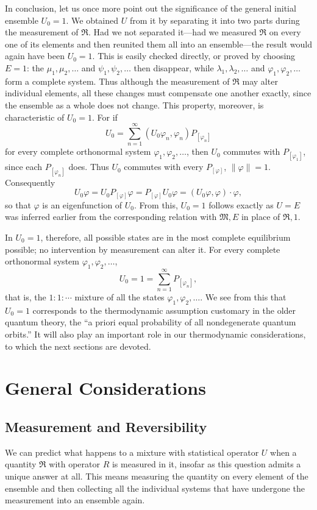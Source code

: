 \documentclass[fontsize=13pt,twoside,openany,headings=normal,parskip=false,bookmarkpackage=false,DIV=calc]{scrbook}
\begin{document}
In conclusion, let us once more point out the significance of the general initial ensemble $U_0=1$. We obtained $U$ from it by separating it into two parts during the measurement of $\mathfrak R$. Had we not separated it---had we measured $\mathfrak R$ on every one of its elements and then reunited them all into an ensemble---the result would again have been $U_0=1$. This is easily checked directly, or proved by choosing $E=1$: the $\mu_1,\mu_2,\ldots$ and $\psi_1,\psi_2,\ldots$ then disappear, while $\lambda_1,\lambda_2,\ldots$ and $\varphi_1,\varphi_2,\ldots$ form a complete system. Thus although the measurement of $\mathfrak R$ may alter individual elements, all these changes must compensate one another exactly, since the ensemble as a whole does not change. This property, moreover, is characteristic of $U_0=1$. For if
\[
U_0=\sum_{n=1}^{\infty}(U_0\varphi_n,\varphi_n)P_{[\varphi_n]}
\]
for every complete orthonormal system $\varphi_1,\varphi_2,\ldots$, then $U_0$ commutes with $P_{[\varphi_1]}$, since each $P_{[\varphi_n]}$ does. Thus $U_0$ commutes with every $P_{[\varphi]}$, $\|\varphi\|=1$. Consequently
\[
U_0\varphi=U_0P_{[\varphi]}\varphi=P_{[\varphi]}U_0\varphi=(U_0\varphi,\varphi)\cdot\varphi,
\]
so that $\varphi$ is an eigenfunction of $U_0$. From this, $U_0=1$ follows exactly as $U=E$ was inferred earlier from the corresponding relation with $\mathfrak M,E$ in place of $\mathfrak R,1$.

In $U_0=1$, therefore, all possible states are in the most complete equilibrium possible; no intervention by measurement can alter it. For every
\hypertarget{origpage-184}{}%
complete orthonormal system $\varphi_1,\varphi_2,\ldots$,
\[
U_0=1=\sum_{n=1}^{\infty}P_{[\varphi_n]},
\]
that is, the $1:1:\cdots$ mixture of all the states $\varphi_1,\varphi_2,\ldots$. We see from this that $U_0=1$ corresponds to the thermodynamic assumption customary in the older quantum theory, the ``a priori equal probability of all nondegenerate quantum orbits.'' It will also play an important role in our thermodynamic considerations, to which the next sections are devoted.

\chapter{General Considerations}\label{chap:V}
\section{Measurement and Reversibility}\label{sec:V.1}
We can predict what happens to a mixture with statistical operator $U$ when a quantity $\mathfrak R$ with operator $R$ is measured in it, insofar as this question admits a unique answer at all. This means measuring the quantity on every element of the ensemble and then collecting all the individual systems that have undergone the measurement into an ensemble again.
\end{document}
